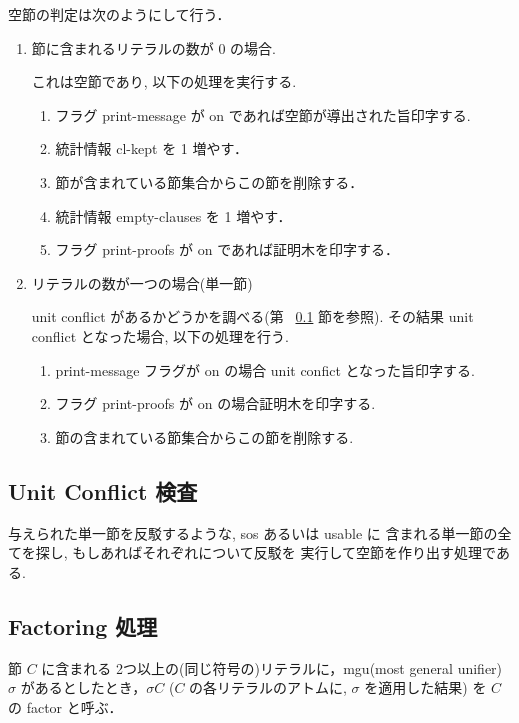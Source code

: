 空節の判定は次のようにして行う．
\begin{enumerate}
\item 節に含まれるリテラルの数が 0 の場合.

  これは空節であり, 以下の処理を実行する.
  \begin{enumerate}
  \item フラグ print-message が on であれば空節が導出された旨印字する.
  \item 統計情報 cl-kept を 1 増やす．
  \item 節が含まれている節集合からこの節を削除する．
  \item 統計情報 empty-clauses を 1 増やす．
  \item フラグ print-proofs が on であれば証明木を印字する．
  \end{enumerate}

\item リテラルの数が一つの場合(単一節)

  unit conflict があるかどうかを調べる(第 ~\ref{sec:unit-conflict} 節を参照).
  その結果 unit conflict となった場合, 以下の処理を行う. 
  \begin{enumerate}
  \item print-message フラグが on の場合 unit confict となった旨印字する.
  \item フラグ print-proofs が on の場合証明木を印字する.
  \item 節の含まれている節集合からこの節を削除する.
  \end{enumerate}
\end{enumerate}

\subsection{Unit Conflict 検査}
\label{sec:unit-conflict}

与えられた単一節を反駁するような, sos あるいは usable に
含まれる単一節の全てを探し, もしあればそれぞれについて反駁を
実行して空節を作り出す処理である.

\subsection{Factoring 処理}
\label{sec:factoring-proc}

節 $C$ に含まれる 2つ以上の(同じ符号の)リテラルに，mgu(most general unifier)
$\sigma$ があるとしたとき，$\sigma C$ ($C$ の各リテラルのアトムに, $\sigma$ 
を適用した結果) を $C$ の factor と呼ぶ．


